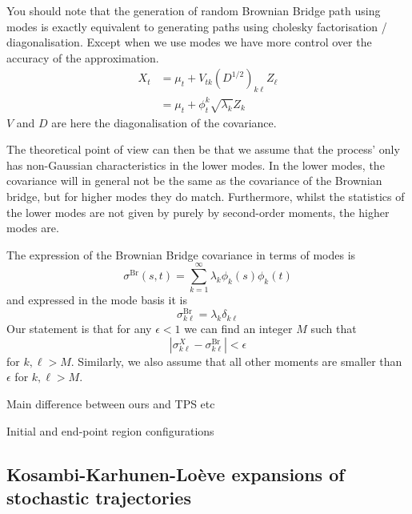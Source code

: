 {\color{red}
You should note that the generation of random Brownian Bridge path using modes is exactly equivalent to generating paths using cholesky factorisation / diagonalisation. Except when we use modes we have more control over the accuracy of the approximation.
\begin{subequations}
\begin{align}
X_t & = \mu_t + V_{tk} (D^{1/2})_{k \ell} Z_\ell \\
& = \mu_t + \phi_t^k \sqrt{\lambda_k} Z_k
\end{align}
\end{subequations}
$V$ and $D$ are here the diagonalisation of the covariance.

The theoretical point of view can then be that we assume that the process' only has non-Gaussian characteristics in the lower modes. In the lower modes, the covariance will in general not be the same as the covariance of the Brownian bridge, but for higher modes they do match. Furthermore, whilst the statistics of the lower modes are not given by purely by second-order moments, the higher modes are.

The expression of the Brownian Bridge covariance in terms of modes is
\begin{equation}
\sigma^\text{Br}(s,t) = \sum_{k=1}^\infty \lambda_k \phi_k(s) \phi_k(t)
\end{equation}
and expressed in the mode basis it is
\begin{equation}
\sigma^\text{Br}_{k \ell} = \lambda_k \delta_{k \ell}
\end{equation}
Our statement is that for any $\epsilon < 1$ we can find an integer $M$ such that
\begin{equation}
|\sigma^{X}_{k \ell} - \sigma^{\text{Br}}_{k \ell}| < \epsilon
\end{equation}
for $k, \ell > M$. Similarly, we also assume that all other moments are smaller than $\epsilon$ for $k, \ell > M$.

}

Main difference between ours and TPS etc

Initial and end-point region configurations

\subsection{Kosambi-Karhunen-Lo\`eve expansions of stochastic trajectories} \label{sec:Kosambi-Karhunen-Loeve expansions of stochastic trajectories}

